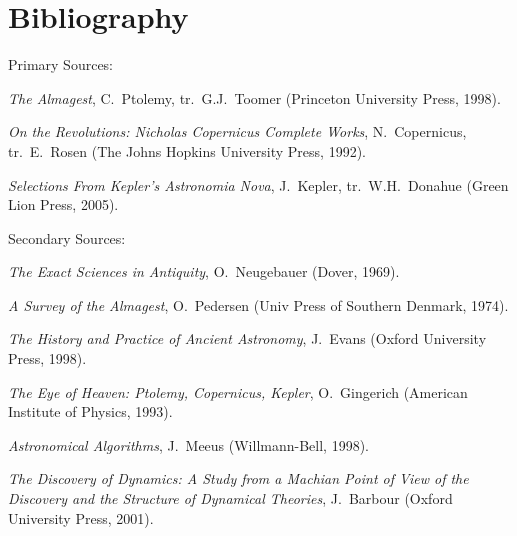 \chapter{Bibliography}
\begin{raggedright}
{\large Primary Sources:}
\end{raggedright}
\begin{description}
\item {\em The Almagest}, C.~Ptolemy, tr.\ G.J.~Toomer (Princeton University Press, 1998).
\item {\em On the Revolutions: Nicholas Copernicus Complete Works},
N.~Copernicus, tr.\ E.~Rosen (The Johns Hopkins University Press, 1992).
\item {\em Selections From Kepler's Astronomia Nova}, J.~Kepler, tr.\ W.H.~Donahue (Green Lion Press, 2005). 
\end{description}
\begin{raggedright}
{\large Secondary Sources:}
\end{raggedright}
\begin{description}
\item {\em The Exact Sciences in Antiquity}, O.~Neugebauer (Dover, 1969).
\item {\em A Survey of the Almagest}, O.~Pedersen (Univ Press of Southern Denmark, 1974).
\item {\em The History and Practice of Ancient Astronomy}, J.~Evans (Oxford University Press, 1998). 
\item {\em The Eye of Heaven: Ptolemy, Copernicus, Kepler}, O.~Gingerich
(American Institute of Physics, 1993).
\item {\em Astronomical Algorithms}, J.~Meeus (Willmann-Bell, 1998).
\item {\em The Discovery of Dynamics: A Study from a Machian Point of View of the Discovery and the Structure of Dynamical Theories},
J.~Barbour (Oxford University Press, 2001).
\end{description}
